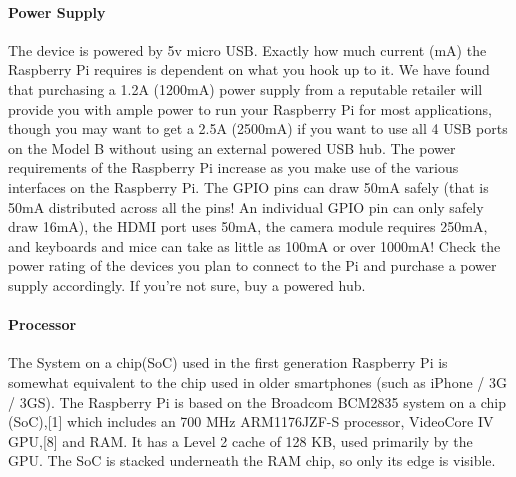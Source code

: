 \documentclass{acm_proc_article-sp}
\begin{document}
\paragraph{Power Supply}
The device is powered by 5v micro USB. Exactly how much current (mA) the Raspberry Pi requires is dependent on what you hook up to it. We have found that purchasing a 1.2A (1200mA) power supply from a reputable retailer will provide you with ample power to run your Raspberry Pi for most applications, though you may want to get a 2.5A (2500mA) if you want to use all 4 USB ports on the Model B without using an external powered USB hub.
\newline
\newline
The power requirements of the Raspberry Pi increase as you make use of the various interfaces on the Raspberry Pi. The GPIO pins can draw 50mA safely (that is 50mA distributed across all the pins! An individual GPIO pin can only safely draw 16mA), the HDMI port uses 50mA, the camera module requires 250mA, and keyboards and mice can take as little as 100mA or over 1000mA! Check the power rating of the devices you plan to connect to the Pi and purchase a power supply accordingly. If you’re not sure, buy a powered hub.

\paragraph{Processor}
The System on a chip(SoC) used in the first generation Raspberry Pi is somewhat equivalent to the chip used in older smartphones (such as iPhone / 3G / 3GS). The Raspberry Pi is based on the Broadcom BCM2835 system on a chip (SoC),[1] which includes an 700 MHz ARM1176JZF-S processor, VideoCore IV GPU,[8] and RAM. It has a Level 2 cache of 128 KB, used primarily by the GPU. The SoC is stacked underneath the RAM chip, so only its edge is visible.
\end{document}
